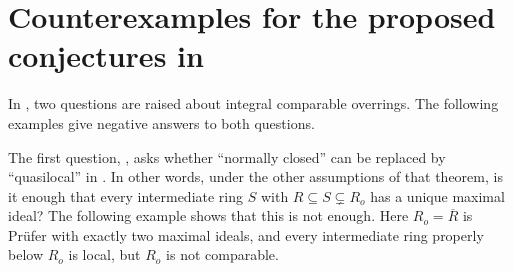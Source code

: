 \documentclass[12pt]{article}
\begin{document}
	\section{Counterexamples for the proposed conjectures in \cite{ayache}} \label{counterexamples}
	
	In \cite[Problems 29 and 30]{ayache}, two questions are raised about integral comparable overrings. The following examples give negative answers to both questions.
	
	The first question, \cite[Problem 29]{ayache}, asks whether ``normally closed'' can be replaced by ``quasilocal'' in \cite[Theorem 24(iii)]{ayache}. In other words, under the other assumptions of that theorem, is it enough that every intermediate ring $S$ with $R\subseteq S\subsetneq R_o$ has a unique maximal ideal? The following example shows that this is not enough. Here $R_o=\overline R$ is Prüfer with exactly two maximal ideals, and every intermediate ring properly below $R_o$ is local, but $R_o$ is not comparable.
\end{document}
